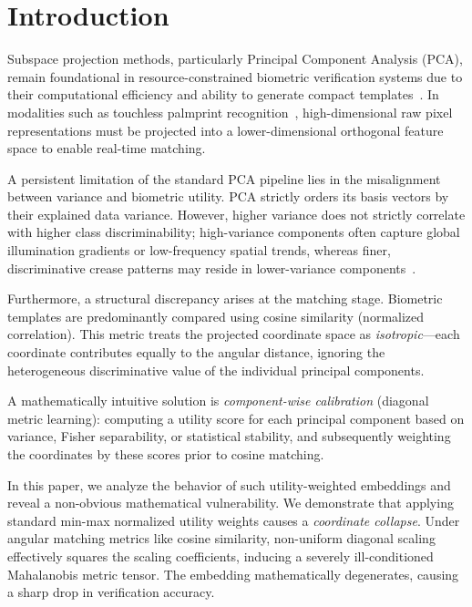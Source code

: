 \documentclass[conference]{IEEEtran}
\begin{document}
\section{Introduction}
\label{sec:introduction}

Subspace projection methods, particularly Principal Component Analysis (PCA), remain foundational in resource-constrained biometric verification systems due to their computational efficiency and ability to generate compact templates~\cite{turk1991eigenfaces, lu2003palmprint}. In modalities such as touchless palmprint recognition~\cite{kumar2008incorporating}, high-dimensional raw pixel representations must be projected into a lower-dimensional orthogonal feature space to enable real-time matching.

A persistent limitation of the standard PCA pipeline lies in the misalignment between variance and biometric utility. PCA strictly orders its basis vectors by their explained data variance. However, higher variance does not strictly correlate with higher class discriminability; high-variance components often capture global illumination gradients or low-frequency spatial trends, whereas finer, discriminative crease patterns may reside in lower-variance components~\cite{belhumeur1997eigenfaces}. 

Furthermore, a structural discrepancy arises at the matching stage. Biometric templates are predominantly compared using cosine similarity (normalized correlation). This metric treats the projected coordinate space as \textit{isotropic}---each coordinate contributes equally to the angular distance, ignoring the heterogeneous discriminative value of the individual principal components.

A mathematically intuitive solution is \textit{component-wise calibration} (diagonal metric learning): computing a utility score for each principal component based on variance, Fisher separability, or statistical stability, and subsequently weighting the coordinates by these scores prior to cosine matching. 

In this paper, we analyze the behavior of such utility-weighted embeddings and reveal a non-obvious mathematical vulnerability. We demonstrate that applying standard min-max normalized utility weights causes a \textit{coordinate collapse}. Under angular matching metrics like cosine similarity, non-uniform diagonal scaling effectively squares the scaling coefficients, inducing a severely ill-conditioned Mahalanobis metric tensor. The embedding mathematically degenerates, causing a sharp drop in verification accuracy.
\end{document}
